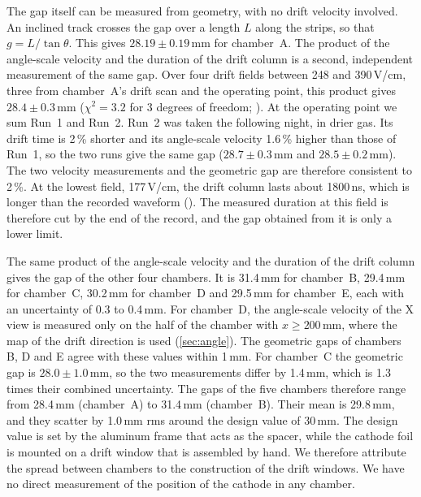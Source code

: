 The gap itself can be measured from geometry, with no drift velocity involved. An inclined track crosses the gap over
a length $L$ along the strips, so that $g=L/\tan\theta$. This gives $28.19\pm0.19$\,mm for chamber~A. The product of
the angle-scale velocity and the duration of the drift column is a second, independent measurement of the same gap.
Over four drift fields between 248 and 390\,V/cm, three from chamber~A's drift scan and the operating point, this
product gives $28.4\pm0.3$\,mm ($\chi^2=3.2$ for 3 degrees of freedom; ). At the operating point
we sum Run~1 and Run~2. Run~2 was taken the following night, in drier gas. Its drift time is 2\,\% shorter and its
angle-scale velocity 1.6\,\% higher than those of Run~1, so the two runs give the same gap ($28.7\pm0.3$\,mm and
$28.5\pm0.2$\,mm). The two velocity measurements and the geometric gap are therefore consistent
to 2\,\%. At the lowest field, 177\,V/cm, the drift column lasts about 1800\,ns, which is longer than the recorded
waveform (). The measured duration at this field is therefore cut by the end of the record, and the
gap obtained from it is only a lower limit.

The same product of the angle-scale velocity and the duration of the drift column gives the gap of the other four
chambers. It is 31.4\,mm for chamber~B, 29.4\,mm for chamber~C, 30.2\,mm for chamber~D and 29.5\,mm for chamber~E,
each with an uncertainty of 0.3 to 0.4\,mm. For chamber~D, the angle-scale velocity of the X view is measured only on the
half of the chamber with $x\ge200$\,mm, where the map of the drift direction is used (\cref{sec:angle}). The geometric
gaps of chambers B, D and E agree with these values within 1\,mm. For chamber~C the geometric gap is $28.0\pm1.0$\,mm,
so the two measurements differ by 1.4\,mm, which is 1.3 times their combined uncertainty.
The gaps of the five chambers therefore range from 28.4\,mm (chamber~A) to 31.4\,mm (chamber~B). Their mean is
29.8\,mm, and they scatter by 1.0\,mm rms around the design value of 30\,mm. The design value is set by the aluminum
frame that acts as the spacer, while the cathode foil is mounted on a drift window that is assembled by hand. We
therefore attribute the spread between chambers to the construction of the drift windows. We have no direct
measurement of the position of the cathode in any chamber.


